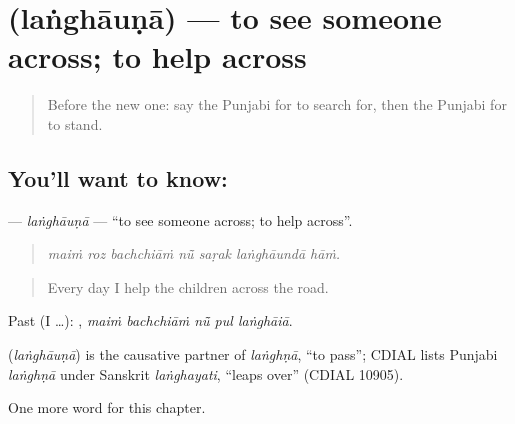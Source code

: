 \section[\texorpdfstring{\pa{ਲੰਘਾਉਣਾ} (laṅghāuṇā)}{ਲੰਘਾਉਣਾ (laṅghāuṇā)}]{ (laṅghāuṇā) — to see someone across; to help across}

\label{lesson:PA-C270-langhauna}



\begin{quote}
Before the new one: say the Punjabi for to search for, then the Punjabi for to stand.
\end{quote}

\subsection*{You'll want to know: }
\textbf{} — \emph{laṅghāuṇā} — \textquotedblleft{}to see someone across; to help across\textquotedblright{}.

\begin{quote}
      
\end{quote}

\begin{quote}
\emph{maiṁ roz bachchiāṁ nū̃ saṛak laṅghāundā hāṁ.}
\end{quote}

\begin{quote}
Every day I help the children across the road.
\end{quote}

Past (I …):     , \emph{maiṁ bachchiāṁ nū̃ pul laṅghāiā}.

\begin{cousinweb}
\textbf{} (\emph{laṅghāuṇā}) is the causative partner of \emph{laṅghṇā}, \textquotedblleft{}to pass\textquotedblright{}; CDIAL lists Punjabi \emph{laṅghṇā} under Sanskrit \emph{laṅghayati}, \textquotedblleft{}leaps over\textquotedblright{} (CDIAL 10905).
\end{cousinweb}

\begin{grammarlens}[title={What you've built}]
One more word for this chapter.
\end{grammarlens}

